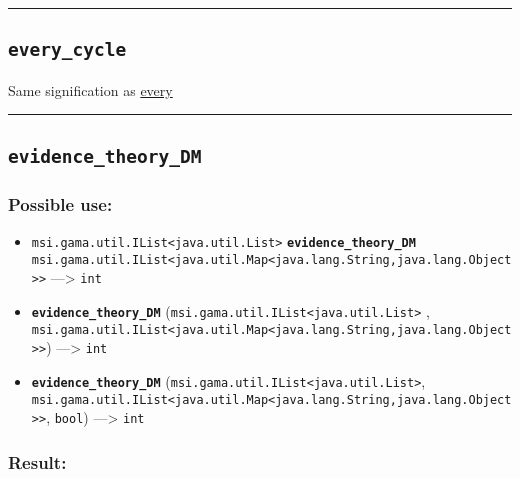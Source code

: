 \documentclass[]{book}
\providecommand{\tightlist}{%
  \setlength{\itemsep}{0pt}\setlength{\parskip}{0pt}}
\theoremstyle{definition}
\theoremstyle{definition}
\theoremstyle{definition}
\theoremstyle{remark}
\begin{document}
\begin{center}\rule{0.5\linewidth}{\linethickness}\end{center}

\subsection{\texorpdfstring{\texttt{every\_cycle}}{every\_cycle}}\label{every_cycle}

Same signification as \href{OperatorsDH\#every}{every}

\begin{center}\rule{0.5\linewidth}{\linethickness}\end{center}

\subsection{\texorpdfstring{\texttt{evidence\_theory\_DM}}{evidence\_theory\_DM}}\label{evidence_theory_dm}

\subsubsection{Possible use:}\label{possible-use-159}

\begin{itemize}
\tightlist
\item
  \texttt{msi.gama.util.IList\textless{}java.util.List\textgreater{}}
  \textbf{\texttt{evidence\_theory\_DM}}
  \texttt{msi.gama.util.IList\textless{}java.util.Map\textless{}java.lang.String,java.lang.Object\textgreater{}\textgreater{}}
  ---\textgreater{} \texttt{int}
\item
  \textbf{\texttt{evidence\_theory\_DM}}
  (\texttt{msi.gama.util.IList\textless{}java.util.List\textgreater{}} ,
  \texttt{msi.gama.util.IList\textless{}java.util.Map\textless{}java.lang.String,java.lang.Object\textgreater{}\textgreater{}})
  ---\textgreater{} \texttt{int}
\item
  \textbf{\texttt{evidence\_theory\_DM}}
  (\texttt{msi.gama.util.IList\textless{}java.util.List\textgreater{}},
  \texttt{msi.gama.util.IList\textless{}java.util.Map\textless{}java.lang.String,java.lang.Object\textgreater{}\textgreater{}},
  \texttt{bool}) ---\textgreater{} \texttt{int}
\end{itemize}

\subsubsection{Result:}\label{result-153}
\end{document}
